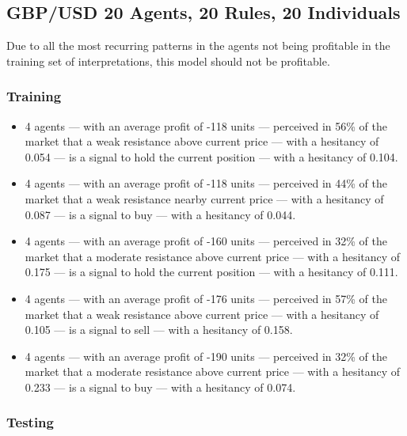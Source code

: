 \subsection{GBP/USD 20 Agents, 20 Rules, 20 Individuals}
\label{}

Due to all the most recurring patterns in the agents not being profitable in the
training set of interpretations, this model should not be profitable.

\subsubsection{Training}
\label{}

{\small
  \begin{itemize}
  \item 4 agents — with an average profit of -118 units — perceived in 56\% of
    the market that a weak resistance above current price — with a hesitancy of
    0.054 — is a signal to hold the current position — with a hesitancy of
    0.104.
  \item 4 agents — with an average profit of -118 units — perceived in 44\% of
    the market that a weak resistance nearby current price — with a hesitancy of
    0.087 — is a signal to buy — with a hesitancy of 0.044.
  \item 4 agents — with an average profit of -160 units — perceived in 32\% of
    the market that a moderate resistance above current price — with a hesitancy
    of 0.175 — is a signal to hold the current position — with a hesitancy of
    0.111.
  \item 4 agents — with an average profit of -176 units — perceived in 57\% of
    the market that a weak resistance above current price — with a hesitancy of
    0.105 — is a signal to sell — with a hesitancy of 0.158.
  \item 4 agents — with an average profit of -190 units — perceived in 32\% of
    the market that a moderate resistance above current price — with a hesitancy
    of 0.233 — is a signal to buy — with a hesitancy of 0.074.
  \end{itemize}
}

\subsubsection{Testing}
\label{}

